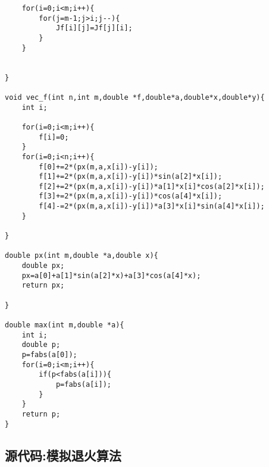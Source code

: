 \documentclass[UTF8]{ctexart}
\begin{document}
\begin{verbatim}
	for(i=0;i<m;i++){
		for(j=m-1;j>i;j--){
			Jf[i][j]=Jf[j][i];
		}
	} 
	
	
}

void vec_f(int n,int m,double *f,double*a,double*x,double*y){
	int i;
	
	for(i=0;i<m;i++){
		f[i]=0;
	}
	for(i=0;i<n;i++){
		f[0]+=2*(px(m,a,x[i])-y[i]);
		f[1]+=2*(px(m,a,x[i])-y[i])*sin(a[2]*x[i]);
		f[2]+=2*(px(m,a,x[i])-y[i])*a[1]*x[i]*cos(a[2]*x[i]);
		f[3]+=2*(px(m,a,x[i])-y[i])*cos(a[4]*x[i]);
		f[4]-=2*(px(m,a,x[i])-y[i])*a[3]*x[i]*sin(a[4]*x[i]);
	}
	
}

double px(int m,double *a,double x){
	double px;
	px=a[0]+a[1]*sin(a[2]*x)+a[3]*cos(a[4]*x);
	return px;
	
}

double max(int m,double *a){
	int i;
	double p;
	p=fabs(a[0]);
	for(i=0;i<m;i++){
		if(p<fabs(a[i])){
			p=fabs(a[i]);
		}
	} 
	return p;
}

\end{verbatim}

\subsection{源代码:模拟退火算法}
\end{document}
